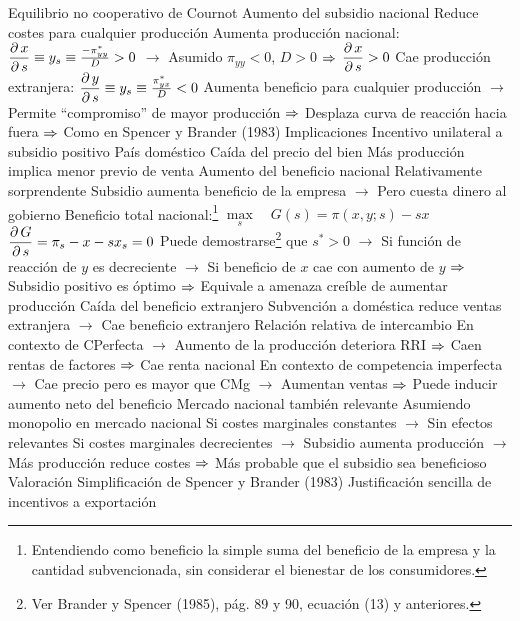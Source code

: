 \documentclass{nuevotema}
\begin{document}
\begin{esquemal}
				\4[] Equilibrio no cooperativo de Cournot
				\4 Aumento del subsidio nacional
				\4[] Reduce costes para cualquier producción
				\4[] Aumenta producción nacional:
				\4[] $\dfrac{\partial \, x}{\partial \, s} \equiv y_s \equiv \frac{-\pi_{yy}^*}{D} > 0$
				\4[] $\to$ Asumido $\pi_{yy} < 0$, $D>0$
				\4[] $\Rightarrow$ $\dfrac{\partial \, x}{\partial \, s} > 0$
				\4[] Cae producción extranjera:
				\4[] $\dfrac{\partial \, y}{\partial \, s} \equiv y_s \equiv \frac{\pi_{yx}^*}{D} < 0$
				\4[] Aumenta beneficio para cualquier producción
				\4[] $\to$ Permite ``compromiso'' de mayor producción
				\4[] $\Rightarrow$ Desplaza curva de reacción hacia fuera
				\4[] $\Rightarrow$ Como en Spencer y Brander (1983)
			\3 Implicaciones
				\4 Incentivo unilateral a subsidio positivo
				\4[] País doméstico
				\4 Caída del precio del bien
				\4[] Más producción implica menor previo de venta
				\4 Aumento del beneficio nacional
				\4[] Relativamente sorprendente
				\4[] Subsidio aumenta beneficio de la empresa
				\4[] $\to$ Pero cuesta dinero al gobierno
				\4[] Beneficio total nacional:\footnote{Entendiendo como beneficio la simple suma del beneficio de la empresa y la cantidad subvencionada, sin considerar el bienestar de los consumidores.}
				\4[] $\underset{s}{\max} \quad G(s) = \pi(x,y; s) - sx$
				\4[] $\dfrac{\partial \, G}{\partial \, s} = \pi_s - x - s x_ s = 0$
				\4[] Puede demostrarse\footnote{Ver Brander y Spencer (1985), pág. 89 y 90, ecuación (13) y anteriores.} que $s^* > 0 $
				\4[] $\to$ Si función de reacción de $y$ es decreciente
				\4[] $\to$ Si beneficio de $x$ cae con aumento de $y$
				\4[] $\Rightarrow$ Subsidio positivo es óptimo
				\4[] $\Rightarrow$ Equivale a amenaza creíble de aumentar producción
				\4 Caída del beneficio extranjero
				\4[] Subvención a doméstica reduce ventas extranjera
				\4[] $\to$ Cae beneficio extranjero
				\4 Relación relativa de intercambio
				\4[] En contexto de CPerfecta
				\4[] $\to$ Aumento de la producción deteriora RRI
				\4[] $\Rightarrow$ Caen rentas de factores
				\4[] $\Rightarrow$ Cae renta nacional
				\4[] En contexto de competencia imperfecta
				\4[] $\to$ Cae precio pero es mayor que CMg
				\4[] $\to$ Aumentan ventas
				\4[] $\Rightarrow$ Puede inducir aumento neto del beneficio
				\4 Mercado nacional también relevante
				\4[] Asumiendo monopolio en mercado nacional
				\4[] Si costes marginales constantes
				\4[] $\to$ Sin efectos relevantes
				\4[] Si costes marginales decrecientes
				\4[] $\to$ Subsidio aumenta producción
				\4[] $\to$ Más producción reduce costes
				\4[] $\Rightarrow$ Más probable que el subsidio sea beneficioso
			\3 Valoración
				\4 Simplificación de Spencer y Brander (1983)
				\4 Justificación sencilla de incentivos a exportación

\end{esquemal}
\end{document}
